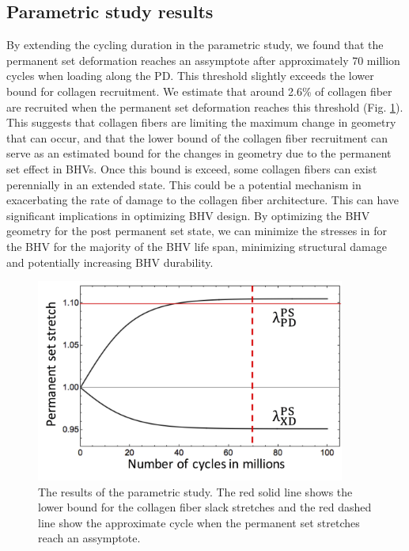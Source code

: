 \subsection{Parametric study results}
	By extending the cycling duration in the parametric study, we found that the permanent set deformation reaches an assymptote after approximately 70 million cycles when loading along the PD. 
	This threshold slightly exceeds the lower bound for collagen recruitment. 
	We estimate that around 2.6\% of collagen fiber are recruited when the permanent set deformation reaches this threshold (Fig. \ref{fig:parametric}). This suggests that collagen fibers are limiting the maximum change in geometry that can occur, and that the lower bound of the collagen fiber recruitment can serve as an estimated bound for the changes in geometry due to the permanent set effect in BHVs. Once this bound is exceed, some collagen fibers can exist perennially in an extended state. This could be a potential mechanism in exacerbating the rate of damage to the collagen fiber architecture. This can have significant implications in optimizing BHV design. By optimizing the BHV geometry for the post permanent set state, we can minimize the stresses in for the BHV for the majority of the BHV life span, minimizing structural damage and potentially increasing BHV durability. 


\begin{figure}[hbt]
\centering
\includegraphics[width=4in]{Images/chapter4/figure17}
\caption{The results of the parametric study. The red solid line shows the lower bound for the collagen fiber slack stretches and the red dashed line show the approximate cycle when the permanent set stretches reach an assymptote.}
\label{fig:parametric}
\end{figure}